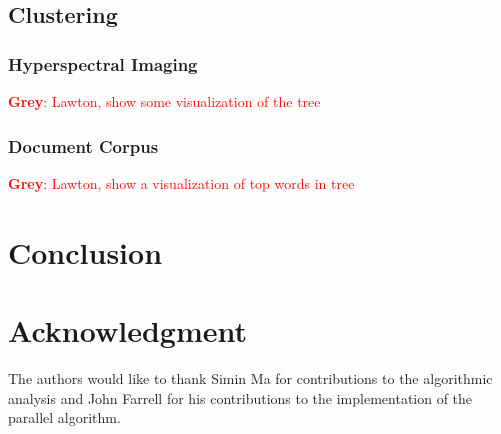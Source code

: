 \documentclass[conference,compsoc]{IEEEtran}
\newcommand{\GB}[1]{\textcolor{red}{\textbf{Grey}: #1}}
\begin{document}
\subsection{Clustering}

\subsubsection{Hyperspectral Imaging}

\GB{Lawton, show some visualization of the tree}

\subsubsection{Document Corpus}

\GB{Lawton, show a visualization of top words in tree}

\section{Conclusion}

\section*{Acknowledgment}

The authors would like to thank Simin Ma for contributions to the algorithmic analysis and John Farrell for his contributions to the implementation of the parallel algorithm.



\end{document}
